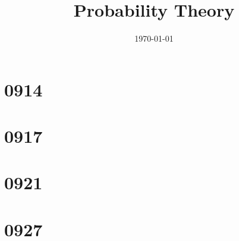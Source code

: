 \documentclass[11pt]{report}
\title{\textbf{Probability Theory}} %
\author{\scribe} %
\date{\today} %
\begin{document}
\maketitle	
\tableofcontents
\chapter{0914}

\chapter{0917}

\chapter{0921}

\chapter{0927}

\end{document}
